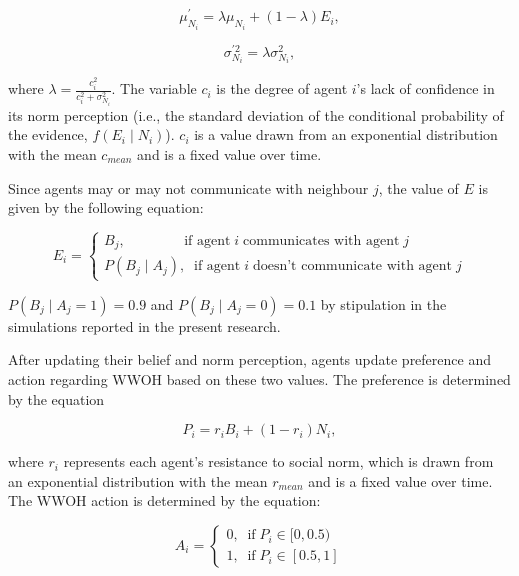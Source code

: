 \documentclass[
  11pt,
]{article}
\begin{document}
\begin{equation}
\label{eq:3}
\mu_{N_i}^{\prime} = \lambda \mu_{N_i} + (1 - \lambda) E_i,
\end{equation}

\begin{equation}
\label{eq:4}
\sigma_{N_i}^{\prime2} = \lambda \sigma_{N_i}^2,
\end{equation}

where \(\lambda = \frac{c_i^2}{c_i^2 + \sigma_{N_i}^2}\). The variable
\(c_i\) is the degree of agent \(i\)'s lack of confidence in its norm
perception (i.e., the standard deviation of the conditional probability
of the evidence, \(f(E_i \mid N_i)\)). \(c_i\) is a value drawn from an
exponential distribution with the mean \(c_{mean}\) and is a fixed value
over time.

Since agents may or may not communicate with neighbour \(j\), the value
of \(E\) is given by the following equation:

\begin{equation}
\label{eq:5}
  E_i = \begin{cases}
    B_j, \;\;\;\;\;\;\;\;\;\;\;\;\;\;\; \text{if agent} \; i \; \text{communicates with agent} \; j \\
    P(B_j \mid A_j), \;\; \text{if agent} \; i \; \text{doesn't communicate with agent} \; j
  \end{cases}
\end{equation}

\(P(B_j \mid A_j = 1) = 0.9\) and \(P(B_j \mid A_j = 0) = 0.1\) by
stipulation in the simulations reported in the present research.

After updating their belief and norm perception, agents update
preference and action regarding WWOH based on these two values. The
preference is determined by the equation

\begin{equation}
  P_i = r_i B_i + (1 - r_i) N_i,
\end{equation}

where \(r_i\) represents each agent's resistance to social norm, which
is drawn from an exponential distribution with the mean \(r_{mean}\) and
is a fixed value over time. The WWOH action is determined by the
equation:

\begin{equation}
  A_i = \begin{cases}
    0, \;\; \text{if} \; P_i \in [0, 0.5)\\
    1, \;\; \text{if} \; P_i \in [0.5, 1]
  \end{cases}
\end{equation}
\end{document}
